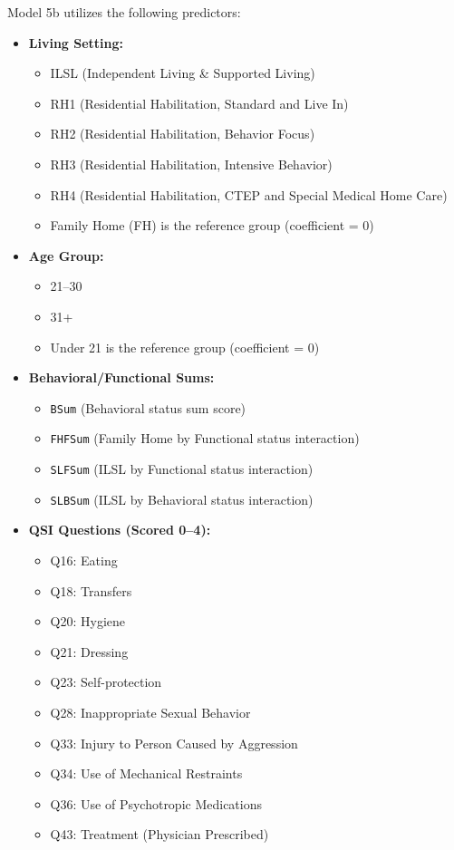 Model 5b utilizes the following predictors:
\begin{itemize}
    \item \textbf{Living Setting:} 
    \begin{itemize}
        \item ILSL (Independent Living \& Supported Living)
        \item RH1 (Residential Habilitation, Standard and Live In)
        \item RH2 (Residential Habilitation, Behavior Focus)
        \item RH3 (Residential Habilitation, Intensive Behavior)
        \item RH4 (Residential Habilitation, CTEP and Special Medical Home Care)
        \item Family Home (FH) is the reference group (coefficient = 0)
    \end{itemize}
    \item \textbf{Age Group:}
    \begin{itemize}
        \item 21--30
        \item 31+
        \item Under 21 is the reference group (coefficient = 0)
    \end{itemize}
    \item \textbf{Behavioral/Functional Sums:}
    \begin{itemize}
        \item \texttt{BSum} (Behavioral status sum score)
        \item \texttt{FHFSum} (Family Home by Functional status interaction)
        \item \texttt{SLFSum} (ILSL by Functional status interaction)
        \item \texttt{SLBSum} (ILSL by Behavioral status interaction)
    \end{itemize}
    \item \textbf{QSI Questions (Scored 0--4):}
    \begin{itemize}
        \item Q16: Eating
        \item Q18: Transfers
        \item Q20: Hygiene
        \item Q21: Dressing
        \item Q23: Self-protection
        \item Q28: Inappropriate Sexual Behavior
        \item Q33: Injury to Person Caused by Aggression
        \item Q34: Use of Mechanical Restraints
        \item Q36: Use of Psychotropic Medications
        \item Q43: Treatment (Physician Prescribed)
    \end{itemize}
\end{itemize}

